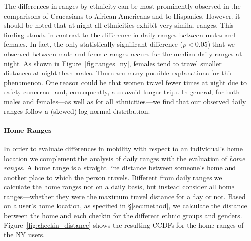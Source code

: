 The differences in ranges by ethnicity can be most prominently observed in the comparisons of Caucasians to African Americans and to Hispanics. However, it should be noted that at night all ethnicities exhibit very similar ranges. This finding stands in contrast to the difference in daily ranges between males and females. In fact, the only statistically significant difference ($p<0.05$) that we observed between male and female ranges occurs for the median daily ranges at night. As shown in Figure~\ref{fig:ranges_ny}, females tend to travel smaller distances at night than males. There are many possible explanations for this phenomenon. One reason could be that women travel fewer times at night due to safety concerns~\cite{badger:2014} and, consequently, also avoid longer trips. In general, for both males and females---as well as for all ethnicities---we find that our observed daily ranges follow a (skewed) log normal distribution.

\paragraph{Home Ranges}

In order to evaluate differences in mobility with respect to an individual's home location we complement the analysis of daily ranges with the evaluation of \emph{home ranges}. A home range is a straight line distance between someone's home and another place to which the person travels. Different from daily ranges we calculate the home ranges not on a daily basis, but instead consider all home ranges---whether they were the maximum travel distance for a day or not. Based on a user's home location, as specified in \S\ref{sec:method}, we calculate the distance between the home and each checkin for the different ethnic groups and genders. Figure~\ref{fig:checkin_distance} shows the resulting CCDFs for the home ranges of the NY users.

